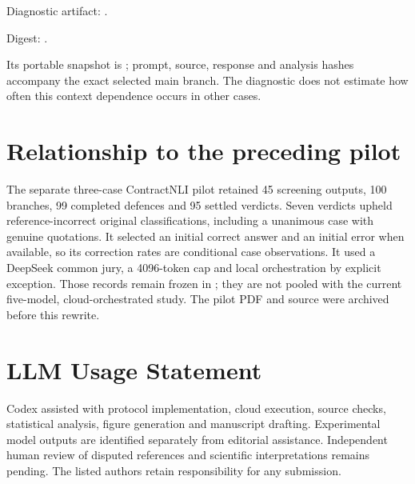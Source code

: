 \begin{table}[htbp]
 \centering\small\setlength{\tabcolsep}{3pt}
 
 \caption{Checked-evidence replies from the original GLM author. The
 displayed amount is in thousands. Probabilities concern the original
 false answer. Missing values preserve the failed seed; jury forecasts
 are not assigned correctness labels.}
 \label{tab:arithmetic-author}
\end{table}

Diagnostic artifact: .

Digest: .

Its portable snapshot is
; prompt, source, response and
analysis hashes accompany the exact selected main branch. The diagnostic
does not estimate how often this context dependence occurs in other cases.

\section{Relationship to the preceding pilot}
The separate three-case ContractNLI pilot retained 45 screening outputs,
100 branches, 99 completed defences and 95 settled verdicts. Seven verdicts
upheld reference-incorrect original classifications, including a unanimous
case with genuine quotations. It selected an initial correct answer and an
initial error when available, so its correction rates are conditional case
observations. It used a DeepSeek common jury, a 4096-token cap and local
orchestration by explicit exception. Those records remain frozen in
; they are not pooled with the current
five-model, cloud-orchestrated study. The pilot PDF and source were archived
before this rewrite.

\section*{LLM Usage Statement}
Codex assisted with protocol implementation, cloud execution, source checks,
statistical analysis, figure generation and manuscript drafting. Experimental
model outputs are identified separately from editorial assistance. Independent
human review of disputed references and scientific interpretations remains
pending. The listed authors retain responsibility for any submission.
